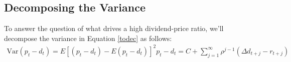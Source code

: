 \documentclass[12pt]{article}
\theoremstyle{plain}
\theoremstyle{definition}
\theoremstyle{remark}
\begin{document}
\newpage
\subsection{Decomposing the Variance}

To answer the question of what drives a high dividend-price ratio,
we'll decompose the variance in Equation \ref{todec} as follows:
\begin{align*}
    \text{Var}(p_t - d_t) = E\left[ (p_t - d_t) - E(p_t - d_t) \right]^2
    p_t - d_t = C +  \sum^\infty_{j=1} \rho^{j-1} (\Delta d_{t+j}
	- r_{t+j})
\end{align*}







%
\end{document}
